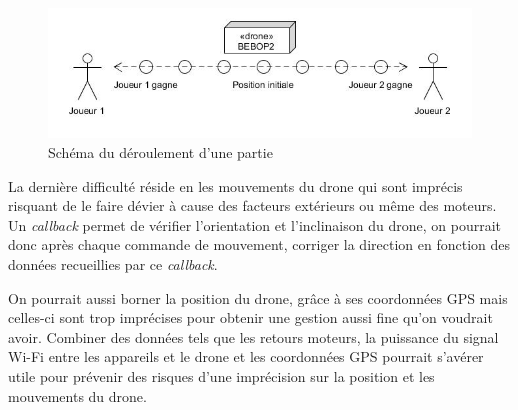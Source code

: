 \begin{figure}[ht]
\begin{center}
\includegraphics[scale=0.5]{images/partie.jpg}
\caption{Schéma du déroulement d'une partie}
\end{center}
\end{figure}

La dernière difficulté réside en les mouvements du drone qui sont imprécis risquant de le faire dévier à cause des facteurs extérieurs ou même des moteurs. Un \textit{callback} permet de vérifier l'orientation et l'inclinaison du drone, on pourrait donc après chaque commande de mouvement, corriger la direction en fonction des données recueillies par ce \textit{callback}.

On pourrait aussi borner la position du drone, grâce à ses coordonnées GPS mais celles-ci sont trop imprécises pour obtenir une gestion aussi fine qu'on voudrait avoir. Combiner des données tels que les retours moteurs, la puissance du signal Wi-Fi entre les appareils et le drone et les coordonnées GPS pourrait s'avérer utile pour prévenir des risques d'une imprécision sur la position et les mouvements du drone.
